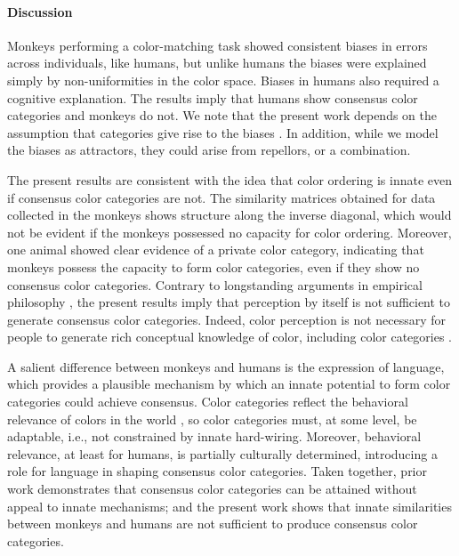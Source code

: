 \documentclass[9pt,biorxiv,lineno,onehalfspacing]{lapreprint}
\begin{document}
\begin{refsection}
\paragraph{Discussion}

Monkeys performing a color-matching task showed consistent biases in errors across individuals, like humans, but unlike humans the biases were explained simply by non-uniformities in the color space. 
Biases in humans also required a cognitive explanation. The results imply that humans show consensus color categories and monkeys do not. 
We note that the present work depends on the assumption that categories give rise to the biases \citep{bae_stimulus-specific_2014}. 
In addition, while we model the biases as attractors, they could arise from repellors, or a combination. 

The present results are consistent with the idea that color ordering is innate even if consensus color categories are not. 
The similarity matrices obtained for data collected in the monkeys shows structure along the inverse diagonal, which would not be evident if the monkeys possessed no capacity for color ordering.
Moreover, one animal showed clear evidence of a private color category, indicating that monkeys possess the capacity to form color categories, even if they show no consensus color categories. Contrary to longstanding arguments in empirical philosophy \citep{RN18743}, the present results imply that perception by itself is not sufficient to generate consensus color categories. Indeed, color perception is not necessary for people to generate rich conceptual knowledge of color, including color categories \citep{kim_shared_2021}.  

A salient difference between monkeys and humans is the expression of language, which provides a plausible mechanism by which an innate potential to form color categories could achieve consensus.
Color categories reflect the behavioral relevance of colors in the world \citep{RN18616,gibson_color_2017, rosenthal_color_2018}, so color categories must, at some level, be adaptable, i.e., not constrained by innate hard-wiring. Moreover, behavioral relevance, at least for humans, is partially culturally determined, introducing a role for language in shaping consensus color categories. Taken together, prior work demonstrates that consensus color categories can be attained without appeal to innate mechanisms; and the present work shows that innate similarities between monkeys and humans are not sufficient to produce consensus color categories. 


\end{refsection}
\end{document}
